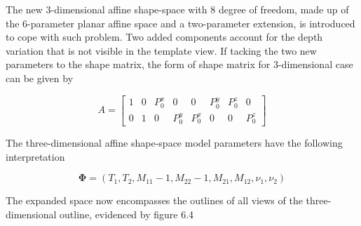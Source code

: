 The new 3-dimensional affine shape-space with 8 degree of freedom,
made up of the 6-parameter planar affine space and a two-parameter
extension, is introduced to cope with such problem. Two added components
account for the depth variation that is not visible in the template
view. If tacking the two new parameters to the shape matrix, the form
of shape matrix for 3-dimensional case can be given by

\begin{equation}
  \label{eq:4.18}
  A =
  \begin{bmatrix}
    1 & 0 & P_0^x & 0 & 0 & P_0^y & P_0^z & 0\\
    0 & 1 & 0 & P_0^y & P_0^x & 0 & 0  & P_0^z
  \end{bmatrix}
\end{equation}

The three-dimensional affine shape-space model parameters have
the following interpretation

\begin{equation}
  \label{eq:4.19}
  \mathbf{\Phi} =  (T_1, T_2, M_{11} - 1, M_{22} - 1, M_{21}, M_{12}, \nu_1, \nu_2)
\end{equation}

The expanded space now encompasses the outlines of all views of the three-dimensional
outline, evidenced by figure 6.4

